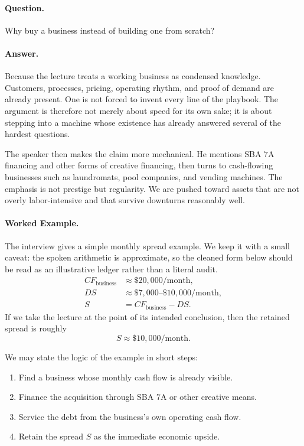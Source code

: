 \paragraph{Question.} Why buy a business instead of building one from scratch?

\paragraph{Answer.} Because the lecture treats a working business as condensed knowledge. Customers, processes, pricing, operating rhythm, and proof of demand are already present. One is not forced to invent every line of the playbook. The argument is therefore not merely about speed for its own sake; it is about stepping into a machine whose existence has already answered several of the hardest questions.

The speaker then makes the claim more mechanical. He mentions SBA \(7\)A financing and other forms of creative financing, then turns to cash-flowing businesses such as laundromats, pool companies, and vending machines. The emphasis is not prestige but regularity. We are pushed toward assets that are not overly labor-intensive and that survive downturns reasonably well.

\paragraph{Worked Example.} The interview gives a simple monthly spread example. We keep it with a small caveat: the spoken arithmetic is approximate, so the cleaned form below should be read as an illustrative ledger rather than a literal audit.
\begin{align}
CF_{\text{business}} &\approx \$20{,}000/\text{month}, \\
DS &\approx \$7{,}000\text{--}\$10{,}000/\text{month}, \\
S &= CF_{\text{business}} - DS.
\end{align}
If we take the lecture at the point of its intended conclusion, then the retained spread is roughly
\begin{equation}
S \approx \$10{,}000/\text{month}.
\end{equation}

We may state the logic of the example in short steps:
\begin{enumerate}
\item Find a business whose monthly cash flow is already visible.
\item Finance the acquisition through SBA \(7\)A or other creative means.
\item Service the debt from the business's own operating cash flow.
\item Retain the spread \(S\) as the immediate economic upside.
\end{enumerate}

